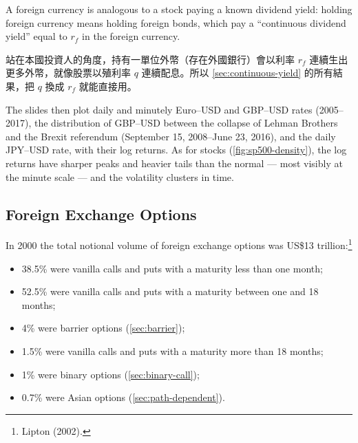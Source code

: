 \suppstart
{}
\suppend

A foreign currency is analogous to a stock paying a known dividend yield: holding foreign currency means holding foreign bonds, which pay a ``continuous dividend yield'' equal to $r_{f}$ in the foreign currency.

\suppstart
{}

\begin{remark}
	站在本國投資人的角度，持有一單位外幣（存在外國銀行）會以利率 $r_{f}$ 連續生出更多外幣，就像股票以殖利率 $q$ 連續配息。所以 \autoref{sec:continuous-yield} 的所有結果，把 $q$ 換成 $r_{f}$ 就能直接用。
\end{remark}
\suppend


The slides then plot daily and minutely Euro--USD and GBP--USD rates (2005--2017), the distribution of GBP--USD between the collapse of Lehman Brothers and the Brexit referendum (September 15, 2008--June 23, 2016), and the daily JPY--USD rate, with their log returns.
\suppstart
As for stocks (\autoref{fig:sp500-density}), the log returns have sharper peaks and heavier tails than the normal --- most visibly at the minute scale --- and the volatility clusters in time.

\suppend

\subsection{Foreign Exchange Options}


In 2000 the total notional volume of foreign exchange options was US\$13 trillion:\footnote{Lipton (2002).}
\begin{itemize}[nosep]
	\item 38.5\% were vanilla calls and puts with a maturity less than one month;
	\item 52.5\% were vanilla calls and puts with a maturity between one and 18 months;
	\item 4\% were barrier options (\autoref{sec:barrier});
	\item 1.5\% were vanilla calls and puts with a maturity more than 18 months;
	\item 1\% were binary options (\autoref{sec:binary-call});
	\item 0.7\% were Asian options (\autoref{sec:path-dependent}).
\end{itemize}

